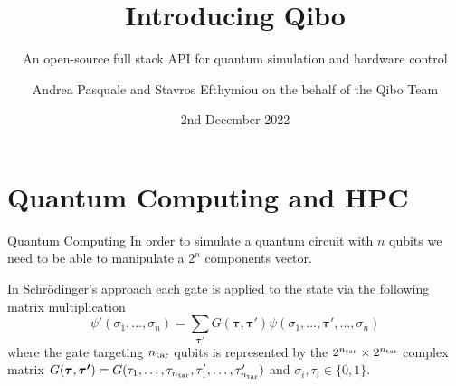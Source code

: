 \documentclass[11p,aspectratio=169]{beamer}
\title{Introducing Qibo}
\subtitle{An open-source full stack API for quantum simulation and hardware control}
\author{Andrea Pasquale and Stavros Efthymiou on the behalf of the Qibo Team}
\date{2nd December 2022}
\begin{document}
\maketitle



\section{Quantum Computing and HPC}

\begin{frame}{Quantum Computing}
    In order to simulate a quantum circuit with $n$ qubits we need to be able to manipulate a $2^n$ components
    vector.

    In Schr\"odinger's approach each gate is applied to the state via the following matrix multiplication
    \begin{equation}\label{eq:gateapplication}
        \psi'(\sigma_1, \ldots, \sigma_n) = \sum _{\boldsymbol{\tau'}} G(\boldsymbol{\tau}, \boldsymbol{\tau'})\psi(\sigma_1,\ldots,\boldsymbol{\tau'},\ldots,\sigma_n)
    \end{equation}
    where the gate targeting $n_{\rm tar}$ qubits is represented by the $2^{n_{\rm
    tar}}\times2^{n_{\rm tar}}$ complex matrix
    $G(\boldsymbol{\tau},\boldsymbol{\tau'})=G(\tau_1,\ldots,\tau_{n_{\rm
    tar}},\tau_1',\ldots,\tau_{n_{\rm tar}}')$ and $\sigma _i, \tau _i\in
    \{0,1\}$.
\end{frame}
\end{document}
